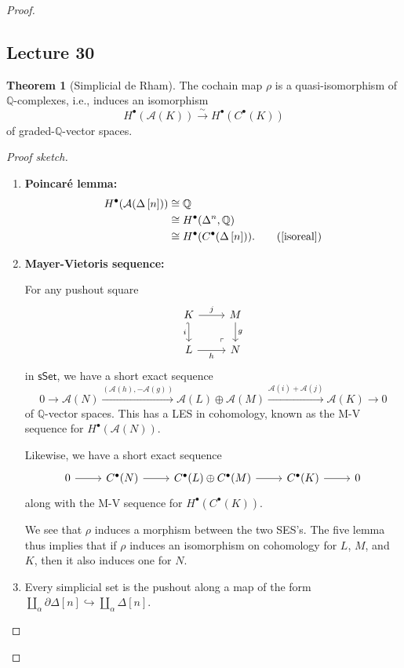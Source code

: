 \documentclass[10pt,letterpaper,cm]{nupset}
\theoremstyle{definition}
\theoremstyle{theorem}
\newtheorem{theorem}[defn]{Theorem}
\theoremstyle{remark}
\newcommand{\A}{\mathcal A}
\newcommand{\Q}{\mathbb Q}
\newcommand{\1}{\mathbb{1}}
\newcommand{\0}{\vec 0}
\newcommand{\be}{\begin{enumerate}}
\newcommand{\ee}{\end{enumerate}}
\begin{document}
\begin{proof}
\subsection{Lecture 30}

\begin{theorem}[Simplicial de Rham]\label{SDR}
The cochain map $\rho$ is a quasi-isomorphism of $\Q$-complexes, i.e., induces an isomorphism 
\[
H^{\bullet}(\A(K)) \xrightarrow{\sim} H^{\bullet}(C^{\bullet}(K))
\] of graded-$\Q$-vector spaces. 
\end{theorem}
\begin{proof}[Proof sketch] $ $
\be
\item \textbf{Poincar\'e lemma:} 
\begin{align*}
H^{\bullet}(\A(\Delta\left[n\right])) &  \cong \Q 
\\ & \cong H^{\bullet}(\Delta^n, \Q) 
\\ & \cong H^{\bullet}(C^{\bullet}(\Delta\left[n\right])). \tag{\cref{isoreal}} 
\end{align*}
\item \textbf{Mayer-Vietoris sequence:} 

For any pushout square
\[
\begin{tikzcd}
	K & M \\
	L & N
	\arrow["i"', hook', from=1-1, to=2-1]
	\arrow["h"', from=2-1, to=2-2]
	\arrow["g", from=1-2, to=2-2]
	\arrow["j", from=1-1, to=1-2]
	\arrow["\lrcorner"{anchor=center, pos=0.125, rotate=180}, draw=none, from=2-2, to=1-1]
\end{tikzcd}
\] in $\mathsf{sSet}$,  we have a short exact sequence
\[
0 \longrightarrow \A(N) \xrightarrow{\left(\A(h), {-\A(g)}\right)} \A(L) \oplus \A(M) \xrightarrow{\A(i) + \A(j)} \A(K) \longrightarrow 0 
\] of $\Q$-vector spaces. This has a LES in cohomology, known as the M-V sequence for $H^{\bullet}(\A(N))$.

Likewise, we have a short exact sequence
\[
\begin{tikzcd}
	0 & {C^{\bullet}(N)} & {C^{\bullet}(L)\oplus C^{\bullet}(M)} & {C^{\bullet}(K)} & 0
	\arrow[from=1-1, to=1-2]
	\arrow[from=1-4, to=1-5]
	\arrow[from=1-2, to=1-3]
	\arrow[from=1-3, to=1-4]
\end{tikzcd}
\] along with the M-V sequence for $H^{\bullet}(C^{\bullet}(K))$. 

We see that $\rho$ induces a morphism between the two SES's. The five lemma thus implies that if $\rho$ induces an isomorphism on cohomology for $L$, $M$, and $K$, then it also induces one for $N$.
\item Every simplicial set is the pushout along a map of the form $\coprod_{\alpha} \partial{\Delta\left[n\right]} \hookrightarrow \coprod_{\alpha}\Delta\left[n\right]$.
\ee
\end{proof}


\end{proof}
\end{document}
